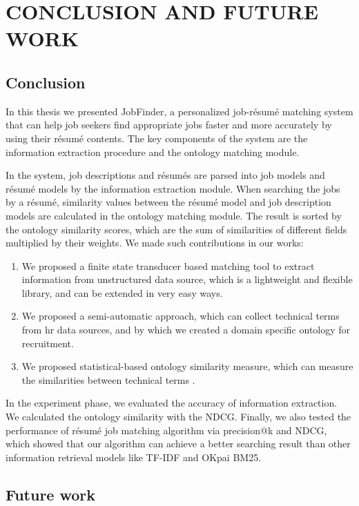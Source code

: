 \chapter{CONCLUSION AND FUTURE WORK}

\section{Conclusion}
In this thesis we presented JobFinder, a personalized job-r\'esum\'e matching system that can help job seekers find appropriate jobs faster and more accurately by using their r\'esum\'e contents. The key components of the system are the information extraction procedure and the ontology matching module.

In the system, job descriptions and r\'esum\'es are parsed into job models and r\'esum\'e models by the information extraction module. When searching the jobs by a r\'esum\'e, similarity values between the r\'esum\'e model and job description models are calculated in the ontology matching module. The result is sorted by the ontology similarity scores, which are the sum of similarities of different fields multiplied by their weights.
We made such contributions in our works:

\begin{enumerate}
    \item  We proposed a finite state transducer based matching tool to extract information from unstructured data source, which is a lightweight and flexible library, and can be extended in very easy ways.
    \item  We proposed a semi-automatic approach, which can collect technical terms from hr data sources, and by which we created a domain specific ontology for recruitment.
    \item  We proposed statistical-based ontology similarity measure, which can measure the similarities between technical terms .
\end{enumerate}

In the experiment phase, we evaluated the accuracy of information extraction. We calculated the ontology similarity with the NDCG. Finally, we also tested the performance of r\'esum\'e job matching algorithm via precision@k and NDCG, which showed that our algorithm can achieve a better searching result than other information retrieval models like TF-IDF and OKpai BM25.


\section{Future work}

